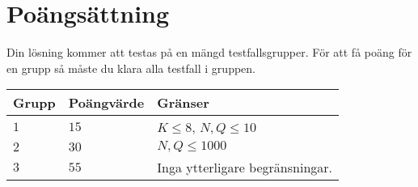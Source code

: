 \section*{Poängsättning}
Din lösning kommer att testas på en mängd testfallsgrupper.
För att få poäng för en grupp så måste du klara alla testfall i gruppen.

\noindent
\begin{tabular}{| l | l | l |}
\hline
Grupp & Poängvärde & Gränser \\ \hline
$1$     & $15$         & $ K \le 8$, $N, Q \leq 10$\\ \hline
$2$     & $30$         & $ N, Q \leq 1000$\\ \hline
$3$     & $55$         & Inga ytterligare begränsningar.\\ \hline
\end{tabular}
